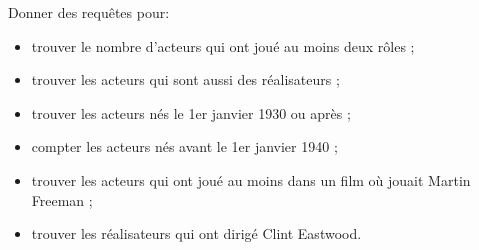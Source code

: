 Donner des requêtes pour:

\begin{itemize}
\item trouver le nombre d'acteurs qui ont joué au moins deux rôles ;
\item trouver les acteurs qui sont aussi des réalisateurs ;
\item trouver les acteurs nés le 1er janvier 1930 ou après ;
\item compter les acteurs nés avant le 1er janvier 1940 ;
\item trouver les acteurs qui ont joué au moins dans un film où jouait
  Martin Freeman ;
\item trouver les réalisateurs qui ont dirigé Clint Eastwood.
\end{itemize}